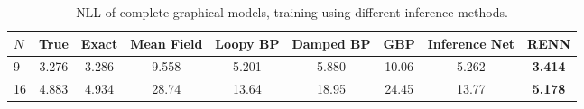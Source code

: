 \begin{table*}[t]
  \caption{NLL of complete graphical models, training using different inference methods.}
  \label{tab:nll-training-full-n3n4}
  \begin{center}
    \begin{small}
      \setlength\tabcolsep{2pt}
      \begin{tabular}{lcccccccc}
        \toprule
        $N$ & True & Exact & Mean Field & Loopy BP & Damped BP & GBP & Inference Net & RENN \\
        \midrule
        9  &  3.276  &  3.286  &  9.558  &  5.201  &  5.880  &  10.06  &  5.262  & \textbf{3.414}  \\
        16  &  4.883  &  4.934  &  28.74  &  13.64  &  18.95  &  24.45  &  13.77  &  \textbf{5.178}  \\
        
        \bottomrule
      \end{tabular}
      
    \end{small}
  \end{center}
\end{table*}



